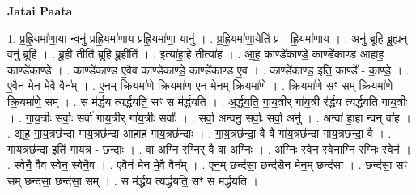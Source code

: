 \documentclass[17pt]{extarticle}
\begin{document}
\textbf{Jatai Paata} \newline

1. प्र॒ह्रि॒यमा॑णा॒या न्वनु॑ प्रह्रि॒यमा॑णाय प्रह्रि॒यमा॑णा॒ यानु॑ । . प्र॒ह्रि॒यमा॑णा॒येति॑ प्र - ह्रि॒यमा॑णाय । . अनु॑ ब्रूहि ब्रू॒ह्यन् वनु॑ ब्रूहि । . ब्रू॒ही तीति॑ ब्रूहि ब्रू॒हीति॑ । . इत्या॑हा॒हे तीत्या॑ह । . आ॒ह॒ काण्डे॑काण्डे॒ काण्डे॑काण्ड आहाह॒ काण्डे॑काण्डे । . काण्डे॑काण्ड ए॒वैव काण्डे॑काण्डे॒ काण्डे॑काण्ड ए॒व । . काण्डे॑काण्ड॒ इति॒ काण्डे᳚ - का॒ण्डे॒ । . ए॒वैन॑ मेन मे॒वै वैन᳚म् । . ए॒न॒म् क्रि॒यमा॑णे क्रि॒यमा॑ण एन मेनम् क्रि॒यमा॑णे । . क्रि॒यमा॑णे॒ सꣳ सम् क्रि॒यमा॑णे क्रि॒यमा॑णे॒ सम् । . स म॑र्द्धय त्यर्द्धयति॒ सꣳ स म॑र्द्धयति । . अ॒र्द्ध॒य॒ति॒ गा॒य॒त्रीर् गा॑य॒त्री र॑र्द्धय त्यर्द्धयति गाय॒त्रीः । . गा॒य॒त्रीः सर्वाः॒ सर्वा॑ गाय॒त्रीर् गा॑य॒त्रीः सर्वाः᳚ । . सर्वा॒ अन्वनु॒ सर्वाः॒ सर्वा॒ अनु॑ । . अन्वा॑ हा॒हा न्वन् वा॑ह । . आ॒ह॒ गा॒य॒त्रछ॑न्दा गाय॒त्रछ॑न्दा आहाह गाय॒त्रछ॑न्दाः । . गा॒य॒त्रछ॑न्दा॒ वै वै गा॑य॒त्रछ॑न्दा गाय॒त्रछ॑न्दा॒ वै । . गा॒य॒त्रछ॑न्दा॒ इति॑ गाय॒त्र - छ॒न्दाः॒ । . वा अ॒ग्नि र॒ग्निर् वै वा अ॒ग्निः । . अ॒ग्निः स्वेन॒ स्वेना॒ग्नि र॒ग्निः स्वेन॑ । . स्वेनै॒ वैव स्वेन॒ स्वेनै॒व । . ए॒वैन॑ मेन मे॒वै वैन᳚म् । . ए॒न॒म् छन्द॑सा॒ छन्द॑सैन मेन॒म् छन्द॑सा । . छन्द॑सा॒ सꣳ सम् छन्द॑सा॒ छन्द॑सा॒ सम् । . स म॑र्द्धय त्यर्द्धयति॒ सꣳ स म॑र्द्धयति । \newline
\end{document}
